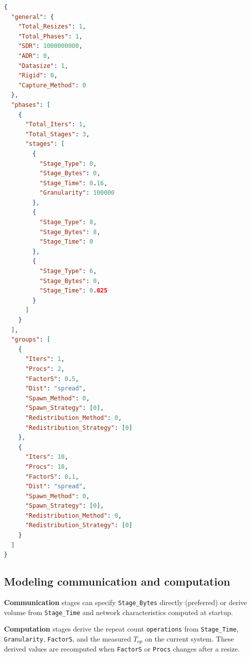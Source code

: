 \begin{lstlisting}[language=json,float,caption={Minimal resize example (2 to 10 processes).},label=code:json-full-example,captionpos=b]
{
  "general": {
    "Total_Resizes": 1,
    "Total_Phases": 1,
    "SDR": 1000000000,
    "ADR": 0,
    "Datasize": 1,
    "Rigid": 0,
    "Capture_Method": 0
  },
  "phases": [
    {
      "Total_Iters": 1,
      "Total_Stages": 3,
      "stages": [
        {
          "Stage_Type": 0,
          "Stage_Bytes": 0,
          "Stage_Time": 0.16,
          "Granularity": 100000
        },
        {
          "Stage_Type": 8,
          "Stage_Bytes": 8,
          "Stage_Time": 0
        },
        {
          "Stage_Type": 6,
          "Stage_Bytes": 0,
          "Stage_Time": 0.025
        }
      ]
    }
  ],
  "groups": [
    {
      "Iters": 1,
      "Procs": 2,
      "FactorS": 0.5,
      "Dist": "spread",
      "Spawn_Method": 0,
      "Spawn_Strategy": [0],
      "Redistribution_Method": 0,
      "Redistribution_Strategy": [0]
    },
    {
      "Iters": 10,
      "Procs": 10,
      "FactorS": 0.1,
      "Dist": "spread",
      "Spawn_Method": 0,
      "Spawn_Strategy": [0],
      "Redistribution_Method": 0,
      "Redistribution_Strategy": [0]
    }
  ]
}
\end{lstlisting}

\subsection{Modeling communication and computation}

\textbf{Communication} stages can specify \texttt{Stage\_Bytes} directly (preferred) or derive volume from \texttt{Stage\_Time} and network characteristics computed at startup.

\textbf{Computation} stages derive the repeat count \texttt{operations} from \texttt{Stage\_Time}, \texttt{Granularity}, \texttt{FactorS}, and the measured \texttt{$T_{op}$} on the current system. These derived values are recomputed when \texttt{FactorS} or \texttt{Procs} changes after a resize.

